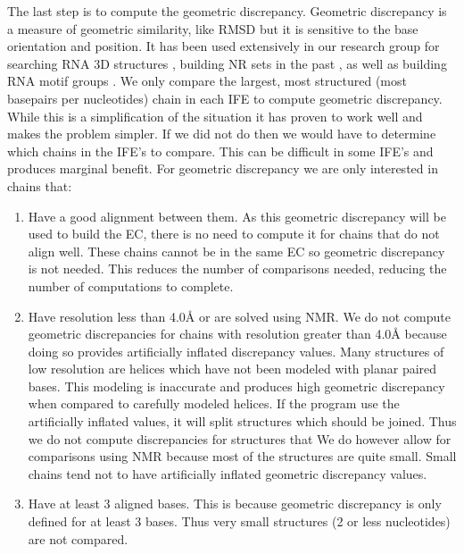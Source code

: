 The last step is to compute the geometric discrepancy. Geometric discrepancy is
a measure of geometric similarity, like RMSD but it is sensitive to the base
orientation and position. It has been used extensively in our research group for
searching RNA 3D structures \cite{Sarver2008a}, building NR sets in the past
\cite{Leontis2012b}, as well as building RNA motif groups \cite{Petrov2013}. We
only compare the largest, most structured (most basepairs per nucleotides) chain
in each IFE to compute geometric discrepancy. While this is a simplification of
the situation it has proven to work well and makes the problem simpler. If we
did not do then we would have to determine which chains in the IFE's to compare.
This can be difficult in some IFE's and produces marginal benefit. For geometric
discrepancy we are only interested in chains that:

\begin{enumerate}
  \item Have a good alignment between them. As this geometric discrepancy will
    be used to build the EC, there is no need to compute it for chains that do not
    align well. These chains cannot be in the same EC so geometric
    discrepancy is not needed. This reduces the number of comparisons needed,
    reducing the number of computations to complete.

  \item Have resolution less than 4.0{\AA} or are solved using NMR. We do not
    compute geometric discrepancies for chains with resolution greater than
    4.0{\AA} because doing so provides artificially inflated discrepancy values.
    Many structures of low resolution are helices which have not been modeled
    with planar paired bases. This modeling is inaccurate and produces high
    geometric discrepancy when compared to carefully modeled helices. If the
    program use the artificially inflated values, it will split structures which
    should be joined. Thus we do not compute discrepancies for structures that
    We do however allow for comparisons using NMR because most of the structures
    are quite small. Small chains tend not to have artificially inflated geometric
    discrepancy values.

  \item Have at least 3 aligned bases. This is because geometric discrepancy is only
    defined for at least 3 bases. Thus very small structures (2 or less
    nucleotides) are not compared.
\end{enumerate}

